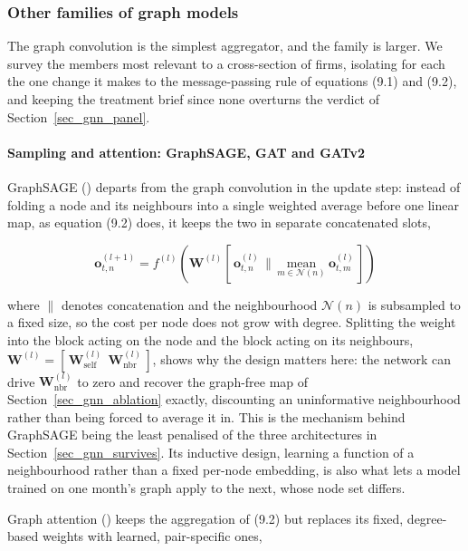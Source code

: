 \subsubsection{Other families of graph models}\label{sec_gnn_families}

The graph convolution is the simplest aggregator, and the family is larger. We survey the members most relevant to a cross-section of firms, isolating for each the one change it makes to the message-passing rule of equations (9.1) and (9.2), and keeping the treatment brief since none overturns the verdict of Section~\ref{sec_gnn_panel}.

\paragraph{Sampling and attention: GraphSAGE, GAT and GATv2}\label{sec_gnn_sage}

GraphSAGE (\cite{hamilton2017inductive}) departs from the graph convolution in the update step: instead of folding a node and its neighbours into a single weighted average before one linear map, as equation (9.2) does, it keeps the two in separate concatenated slots,

\begin{equation}
\label{eq_gnn_3}
\mathbf{o}_{t,n}^{(l+1)} = f^{(l)}\!\left( \mathbf{W}^{(l)} \left[\, \mathbf{o}_{t,n}^{(l)} \,\Big\|\, \underset{m \in \mathcal{N}(n)}{\mathrm{mean}}\ \mathbf{o}_{t,m}^{(l)} \,\right] \right)
\end{equation}

where $\|$ denotes concatenation and the neighbourhood $\mathcal{N}(n)$ is subsampled to a fixed size, so the cost per node does not grow with degree. Splitting the weight into the block acting on the node and the block acting on its neighbours, $\mathbf{W}^{(l)} = [\,\mathbf{W}^{(l)}_{\mathrm{self}}\ \ \mathbf{W}^{(l)}_{\mathrm{nbr}}\,]$, shows why the design matters here: the network can drive $\mathbf{W}^{(l)}_{\mathrm{nbr}}$ to zero and recover the graph-free map of Section~\ref{sec_gnn_ablation} exactly, discounting an uninformative neighbourhood rather than being forced to average it in. This is the mechanism behind GraphSAGE being the least penalised of the three architectures in Section~\ref{sec_gnn_survives}. Its inductive design, learning a function of a neighbourhood rather than a fixed per-node embedding, is also what lets a model trained on one month's graph apply to the next, whose node set differs.

Graph attention (\cite{velickovic2018graph}) keeps the aggregation of (9.2) but replaces its fixed, degree-based weights with learned, pair-specific ones,

